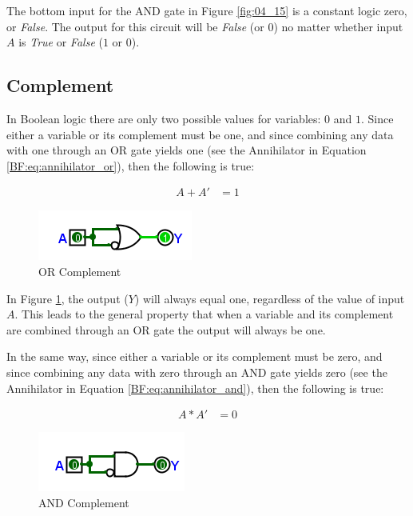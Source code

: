 The bottom input for the \textsf{AND} gate in Figure \ref{fig:04_15} is a constant logic zero, or \emph{False}. The output for this circuit will be \emph{False} (or $ 0 $) no matter whether input $ A $ is \emph{True} or \emph{False} ($ 1 $ or $ 0 $).

\subsection{Complement}
\label{BF:subsec:complement}

In Boolean logic there are only two possible values for variables: $ 0 $ and $ 1 $. Since either a variable or its complement must be one, and since combining any data with one through an \textsf{OR} gate yields one (see the Annihilator in Equation \ref{BF:eq:annihilator_or}), then the following is true:

\begin{align}
  \label{BF:eq:complement_or}
  A + A' &= 1 
\end{align}

\begin{figure}[H]
	\centering
	\includegraphics[width=\maxwidth{.95\linewidth}]{gfx/04_16}
	\caption{OR Complement}
	\label{fig:04_16}
\end{figure}

In Figure \ref{fig:04_16}, the output ($ Y $) will always equal one, regardless of the value of input $ A $. This leads to the general property that when a variable and its complement are combined through an \textsf{OR} gate the output will always be one. 

In the same way, since either a variable or its complement must be zero, and since combining any data with zero through an \textsf{AND} gate yields zero (see the Annihilator in Equation \ref{BF:eq:annihilator_and}), then the following is true: 

\begin{align}
  \label{BF:eq:complement_and}
  A * A' &= 0
\end{align}

\begin{figure}[H]
	\centering
	\includegraphics[width=\maxwidth{.95\linewidth}]{gfx/04_17}
	\caption{AND Complement}
	\label{fig:04_17}
\end{figure}

